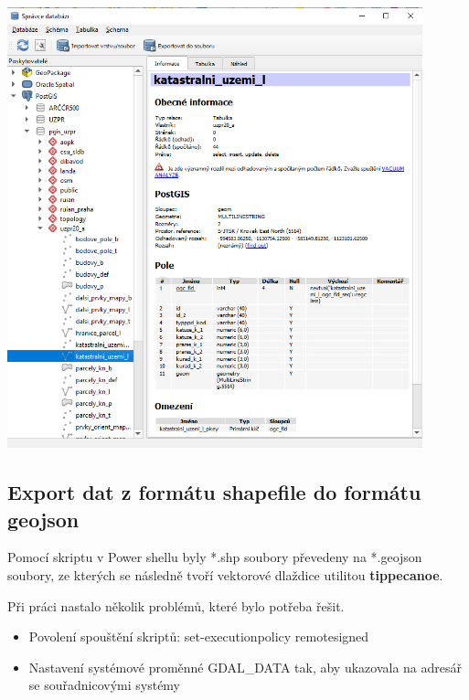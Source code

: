 \documentclass[12pt]{article}
\begin{document}
\begin{center}
	\includegraphics[width=12cm]{./img/qgis_spravce_db_ku.png}
\end{center}

\subsection{Export dat z formátu shapefile do formátu geojson}

Pomocí skriptu v Power shellu byly *.shp soubory převedeny na *.geojson soubory, ze kterých se následně tvoří vektorové dlaždice utilitou \textbf{tippecanoe}.

\vspace{0.5cm}
Při práci nastalo několik problémů, které bylo potřeba řešit.
\begin{itemize}
	
	\item Povolení spouštění skriptů: set-executionpolicy remotesigned
	
	\item Nastavení systémové proměnné GDAL\_DATA tak, aby ukazovala na adresář se souřadnicovými systémy
	
\end{itemize}

\end{document}
